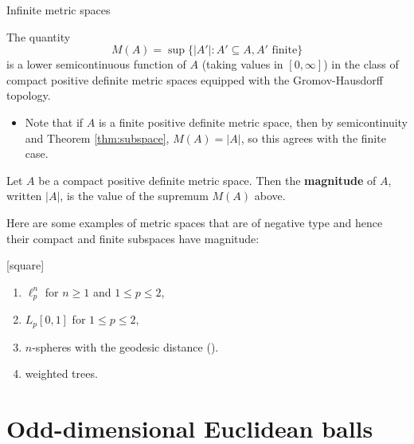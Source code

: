 \documentclass[12pt]{beamer}
\begin{document}
\begin{frame}[allowframebreaks]{Infinite metric spaces}
\framebreak

\begin{theorem}
The quantity
\begin{equation*}
M(A) = \sup\{\vert A'\vert : A' \subseteq A, \text{$A'$ finite}\}
\end{equation*}
is a lower semicontinuous function of $A$ (taking values in $[0,\infty]$) in the class of compact positive definite metric spaces equipped with the Gromov-Hausdorff topology.
\end{theorem}

\begin{itemize}
\item Note that if $A$ is a finite positive definite metric space, then by semicontinuity and Theorem \ref{thm:subspace}, $M(A) = \vert A \vert$, so this agrees with the finite case.
\end{itemize}

\framebreak

\begin{definition}
Let $A$ be a compact positive definite metric space. Then the \textbf{magnitude} of $A$, written $\vert A \vert$, is the value of the supremum $M(A)$ above.
\end{definition}

\framebreak

Here are some examples of metric spaces that are of negative type and hence their compact and finite subspaces have magnitude:

\begin{example}
[square]
\begin{enumerate}
\item $\ell_p^n$ for $n \geq 1$ and $1\leq p \leq 2$,
\item $L_p[0,1]$ for $1 \leq p \leq 2$,
\item $n$-spheres with the geodesic distance (\cite{willerton_magnitude_2014}).
\item weighted trees.
\end{enumerate}
\end{example}

\end{frame}

\section{Odd-dimensional Euclidean balls}
\end{document}
